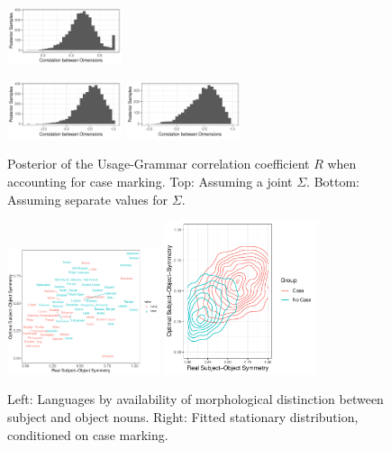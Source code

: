 \documentclass[11pt,a4paper]{article}
\begin{document}
\begin{figure}
    \centering
    \includegraphics[width=0.3\textwidth]{../change/visualize/figures/corr_ornuhl-binom_42.pdf}
    
    \includegraphics[width=0.3\textwidth]{../change/visualize/figures/corr_ornuhl-binom_45_Case.pdf}
    \includegraphics[width=0.3\textwidth]{../change/visualize/figures/corr_ornuhl-binom_45_NoCase.pdf}
    \caption{Posterior of the Usage-Grammar correlation coefficient $R$ when accounting for case marking. Top: Assuming a joint $\Sigma$. Bottom: Assuming separate values for $\Sigma$.}
    \label{fig:posterior-case}
\end{figure}

\begin{figure}
    \centering
    \includegraphics[width=0.4\textwidth]{../analysis/figures/by_patient_marking.pdf}
    \includegraphics[width=0.4\textwidth]{../change/visualize/stationary_case.pdf}
    \caption{Left: Languages by availability of morphological distinction between subject and object nouns. Right: Fitted stationary distribution, conditioned on case marking.}
    \label{fig:langs-case}
\end{figure}
\end{document}
